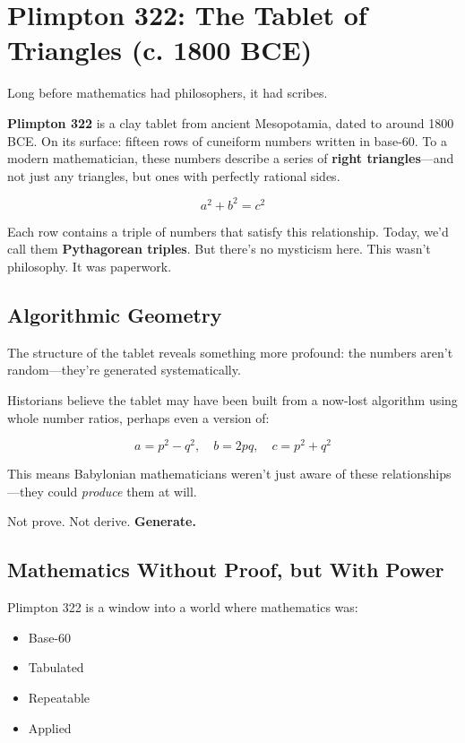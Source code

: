 \section{Plimpton 322: The Tablet of Triangles (c. 1800 BCE)}

Long before mathematics had philosophers, it had scribes.

\textbf{Plimpton 322} is a clay tablet from ancient Mesopotamia, dated to around 1800 BCE. On its surface: fifteen rows of cuneiform numbers written in base-60.  
To a modern mathematician, these numbers describe a series of \textbf{right triangles}—and not just any triangles, but ones with perfectly rational sides.

\[
a^2 + b^2 = c^2
\]

Each row contains a triple of numbers that satisfy this relationship. Today, we’d call them \textbf{Pythagorean triples}.  
But there’s no mysticism here. This wasn’t philosophy. It was paperwork.

\subsection{Algorithmic Geometry}

The structure of the tablet reveals something more profound:  
the numbers aren’t random—they’re generated systematically.

Historians believe the tablet may have been built from a now-lost algorithm using whole number ratios, perhaps even a version of:

\[
a = p^2 - q^2, \quad b = 2pq, \quad c = p^2 + q^2
\]

This means Babylonian mathematicians weren’t just aware of these relationships—they could \textit{produce} them at will.

Not prove. Not derive.  
\textbf{Generate.}

\subsection{Mathematics Without Proof, but With Power}

Plimpton 322 is a window into a world where mathematics was:

\begin{itemize}
    \item Base-60
    \item Tabulated
    \item Repeatable
    \item Applied
\end{itemize}

